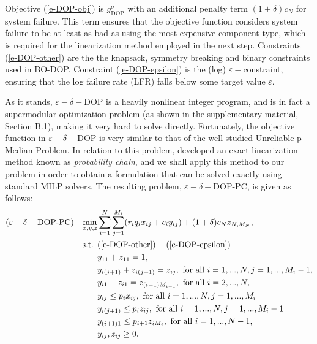 \documentclass[11pt,authoryear,a4paper]{article}
\theoremstyle{definition}
\begin{document}
Objective (\ref{e-DOP-obj}) is $g^o_{\text{DOP}}$ with an additional penalty term $(1+\delta)c_N$ for system failure. This term ensures that the objective function considers system failure to be at least as bad as using the most expensive component type{, which is required for the linearization method employed in the next step}. Constraints (\ref{e-DOP-other}) are the the knapsack, symmetry breaking and binary constraints used in BO-DOP. Constraint (\ref{e-DOP-epsilon}) is the (log) $\varepsilon-$constraint, ensuring that the log failure rate (LFR) falls below some target value $\varepsilon$.  

{As it stands, $\varepsilon-\delta-$DOP is a heavily nonlinear integer program, and is in fact a supermodular optimization problem (as shown in the supplementary material, Section B.1), making it very hard to solve directly.} Fortunately, the objective function in $\varepsilon-\delta-$DOP is very similar to that of the well-studied Unreliable p-Median Problem. In relation to this problem, \cite{OHANLEY201363} developed an exact linearization method known as \emph{probability chain}, and we shall apply this method to our problem in order to obtain a formulation that can be solved exactly using standard MILP solvers. The resulting problem, $\varepsilon-\delta-$DOP-PC, is given as follows:
\begin{align}
     &(\varepsilon-\delta-\text{DOP-PC}) &\min_{x,y,z} &\sum_{i=1}^N\sum_{j=1}^{M_i} (r_iq_ix_{ij} + c_iy_{ij}) + (1 + \delta) c_N z_{N,M_N}, \nonumber\\
    &&\text{s.t. }& (\ref{e-DOP-other}) - (\ref{e-DOP-epsilon}) \nonumber \\
    &&& y_{11} + z_{11} = 1, \label{e-d-dop-pc-1}\\
    &&& y_{i(j+1)} + z_{i(j+1)} = z_{ij}, \text{ for all } i = 1,...,N, j = 1,...,M_i-1,\label{e-d-dop-pc-2} \\
    &&&y_{i1} + z_{i1} = z_{(i-1)M_{i-1}}, \text{ for all } i = 2,...,N,\label{e-d-dop-pc-3} \\
    &&& y_{ij} \leq p_ix_{ij}, \text{ for all }i=1,...,N, j = 1,...,M_i\label{e-d-dop-pc-4}\\
    &&& y_{i(j+1)} \leq p_{i}z_{ij}, \text{ for all }i = 1,...,N, j = 1,...,M_i-1\label{e-d-dop-pc-5}\\
    &&&y_{(i+1)1} \leq p_{i+1}z_{iM_i}, \text{ for all }i=1,...,N-1,\label{e-d-dop-pc-6}\\
    &&&y_{ij}, z_{ij} \geq 0.
\end{align}
\end{document}
